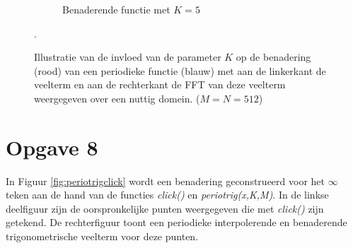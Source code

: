\documentclass[a4paper]{article}
\newcommand{\opgave}[1]{\section*{Opgave #1}}
\begin{document}
\begin{figure}
\begin{subfigure}[b]{\textwidth}
        \caption{Benaderende functie met $K=5$}
        \label{fig:periotrigc}
        \vspace*{1cm}
    \end{subfigure}
    \caption{Illustratie van de invloed van de parameter $K$ op de benadering (rood) van een periodieke functie (blauw) met aan de linkerkant de veelterm en aan de rechterkant de FFT van deze veelterm weergegeven over een nuttig domein. ($M = N = 512$)}\label{fig:periotrig}.
\end{figure}
\opgave{8}
In Figuur \ref{fig:periotrigclick} wordt een benadering geconstrueerd voor het $\infty$ teken aan de hand van de functies \textit{click()} en \textit{periotrig(x,K,M)}. In de linkse deelfiguur zijn de oorspronkelijke punten weergegeven die met \textit{click()} zijn getekend. De rechterfiguur toont een periodieke interpolerende en benaderende trigonometrische veelterm voor deze punten.
\end{document}
